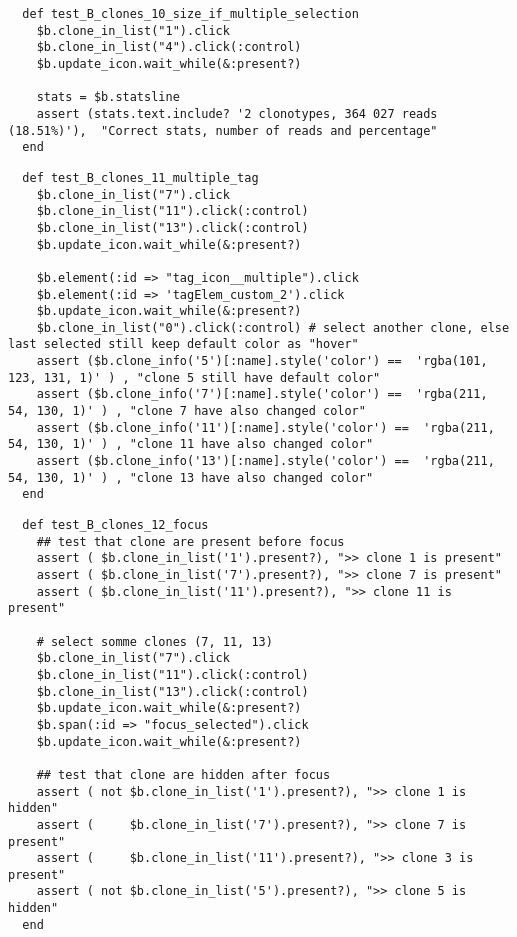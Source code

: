 \begin{verbatim}
  def test_B_clones_10_size_if_multiple_selection
    $b.clone_in_list("1").click
    $b.clone_in_list("4").click(:control)
    $b.update_icon.wait_while(&:present?)

    stats = $b.statsline
    assert (stats.text.include? '2 clonotypes, 364 027 reads (18.51%)'),  "Correct stats, number of reads and percentage"
  end
\end{verbatim}

\begin{verbatim}
  def test_B_clones_11_multiple_tag
    $b.clone_in_list("7").click
    $b.clone_in_list("11").click(:control)
    $b.clone_in_list("13").click(:control)
    $b.update_icon.wait_while(&:present?)

    $b.element(:id => "tag_icon__multiple").click
    $b.element(:id => 'tagElem_custom_2').click
    $b.update_icon.wait_while(&:present?)
    $b.clone_in_list("0").click(:control) # select another clone, else last selected still keep default color as "hover"
    assert ($b.clone_info('5')[:name].style('color') ==  'rgba(101, 123, 131, 1)' ) , "clone 5 still have default color"
    assert ($b.clone_info('7')[:name].style('color') ==  'rgba(211, 54, 130, 1)' ) , "clone 7 have also changed color"
    assert ($b.clone_info('11')[:name].style('color') ==  'rgba(211, 54, 130, 1)' ) , "clone 11 have also changed color"
    assert ($b.clone_info('13')[:name].style('color') ==  'rgba(211, 54, 130, 1)' ) , "clone 13 have also changed color"
  end
\end{verbatim}

\begin{verbatim}
  def test_B_clones_12_focus
    ## test that clone are present before focus
    assert ( $b.clone_in_list('1').present?), ">> clone 1 is present"
    assert ( $b.clone_in_list('7').present?), ">> clone 7 is present"
    assert ( $b.clone_in_list('11').present?), ">> clone 11 is present"
    
    # select somme clones (7, 11, 13)
    $b.clone_in_list("7").click
    $b.clone_in_list("11").click(:control)
    $b.clone_in_list("13").click(:control)
    $b.update_icon.wait_while(&:present?)
    $b.span(:id => "focus_selected").click
    $b.update_icon.wait_while(&:present?)

    ## test that clone are hidden after focus
    assert ( not $b.clone_in_list('1').present?), ">> clone 1 is hidden"
    assert (     $b.clone_in_list('7').present?), ">> clone 7 is present"
    assert (     $b.clone_in_list('11').present?), ">> clone 3 is present"
    assert ( not $b.clone_in_list('5').present?), ">> clone 5 is hidden"
  end
\end{verbatim}

